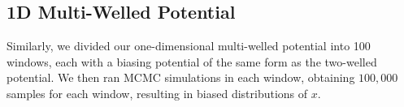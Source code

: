 \documentclass{article}
\begin{document}
\subsection{1D Multi-Welled Potential}

Similarly, we divided our one-dimensional multi-welled potential into 100 windows, each with a biasing potential of the same form as the two-welled potential. We then ran MCMC simulations in each window, obtaining $100,000$ samples for each window, resulting in biased distributions of $x$.
\end{document}
